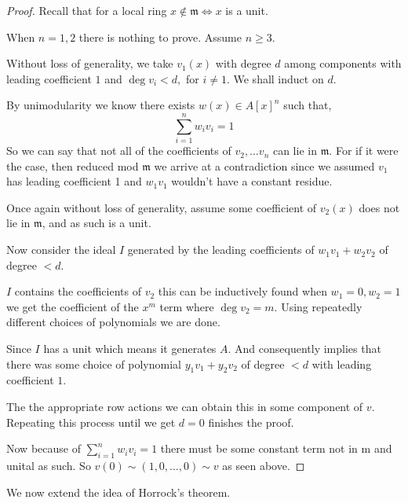 \documentclass[12pt]{article}
\numberwithin{equation}{section}
\begin{document}
	\begin{proof}
	Recall that for a local ring $x \not \in \mathfrak m \iff x  $ is a unit.
	
	When $n=1,2 $ there is nothing to prove. Assume $n \geq 3$.
	
	
	Without loss of generality, we take $v_1(x)$ with degree $d $ among components with leading coefficient $1$ and $\deg v_i < d, $ for $i \neq 1$. We shall induct on $d$.
	
	By unimodularity we know there exists $w(x)\in A[x]^n$ such that,
	\[ \sum_{i=1}^n w_i v_i = 1 \]
	So we can say that not all of the coefficients of $v_2, \dots v_n $ can lie in $\mathfrak m$. For if it were the case, then reduced mod $\mathfrak m$ we arrive at a contradiction since we assumed $v_1 $ has leading coefficient 1 and $w_1v_1$ wouldn't have a constant residue.
	
	Once again without loss of generality, assume some coefficient of $v_2(x)$ does not lie in $\mathfrak m$, and as such is a unit.
	
	Now consider the ideal $I$ generated by the leading coefficients of $w_1v_1+w_2v_2$ of degree $< d.$ 
	
	$I$ contains the coefficients of $v_2$ this can be inductively found when $w_1=0, w_2=1$ we get the coefficient of the $x^m$ term where $\deg v_2 = m$.
	Using repeatedly different choices of polynomials we are done.
	
	Since $I$ has a unit which means it generates $A$. And consequently implies that there was some choice of polynomial $y_1v_1+y_2v_2$ of degree $<d$ with leading coefficient $1$.
	
	The the appropriate row actions we can obtain this in some component of $v$. Repeating this process until we get $d=0$ finishes the proof.
	
	Now because of $\sum_{i=1}^n w_i v_i =1 $ there must be some constant term not in $\mathrm m $ and unital as such. So $v(0) \sim (1,0,\dots ,0 ) \sim v$ as seen above.
	\end{proof}
	
	We now extend the idea of Horrock's theorem.
	
\end{document}
